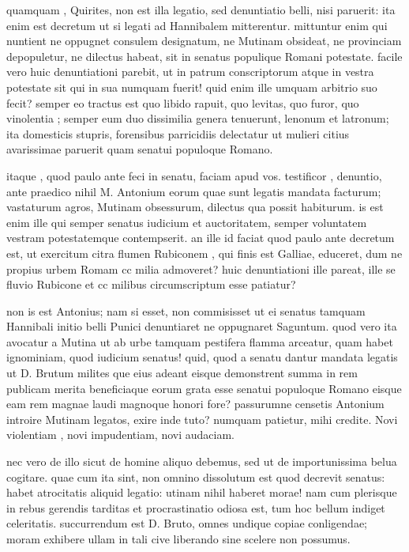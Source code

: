  quamquam , Quirites, non est illa legatio, sed denuntiatio belli, nisi paruerit: ita enim est decretum ut si legati ad Hannibalem mitterentur. mittuntur enim qui nuntient ne oppugnet consulem designatum, ne Mutinam obsideat, ne provinciam depopuletur, ne dilectus habeat, sit in senatus populique Romani potestate. facile vero huic denuntiationi parebit, ut in patrum conscriptorum atque in vestra potestate sit qui in sua numquam fuerit! quid enim ille umquam arbitrio suo fecit? semper eo tractus est quo libido rapuit, quo levitas, quo furor, quo vinolentia ; semper eum duo dissimilia genera tenuerunt, lenonum et latronum; ita domesticis stupris, forensibus parricidiis delectatur ut mulieri citius avarissimae paruerit quam senatui populoque Romano.

 itaque , quod paulo ante feci in senatu, faciam apud vos. testificor , denuntio, ante praedico nihil M. Antonium eorum quae sunt legatis mandata facturum; vastaturum agros, Mutinam obsessurum, dilectus qua possit habiturum. is est enim ille qui semper senatus iudicium et auctoritatem, semper voluntatem vestram potestatemque contempserit. an ille id faciat quod paulo ante decretum est, ut exercitum citra flumen Rubiconem , qui finis est Galliae, educeret, dum ne propius urbem Romam cc milia admoveret? huic denuntiationi ille pareat, ille se fluvio Rubicone et cc milibus circumscriptum esse patiatur?

 non is est Antonius; nam si esset, non commisisset ut ei senatus tamquam Hannibali initio belli Punici denuntiaret ne oppugnaret Saguntum. quod vero ita avocatur a Mutina ut ab urbe tamquam pestifera flamma arceatur, quam habet ignominiam, quod iudicium senatus! quid, quod a senatu dantur mandata legatis ut D. Brutum milites que eius adeant eisque demonstrent summa in rem publicam merita beneficiaque eorum grata esse senatui populoque Romano eisque eam rem magnae laudi magnoque honori fore? passurumne censetis Antonium introire Mutinam legatos, exire inde tuto? numquam patietur, mihi credite. Novi violentiam , novi impudentiam, novi audaciam.

 nec vero de illo sicut de homine aliquo debemus, sed ut de importunissima belua cogitare. quae cum ita sint, non omnino dissolutum est quod decrevit senatus: habet atrocitatis aliquid legatio: utinam nihil haberet morae! nam cum plerisque in rebus gerendis tarditas et procrastinatio odiosa est, tum hoc bellum indiget celeritatis. succurrendum est D. Bruto, omnes undique copiae conligendae; moram exhibere ullam in tali cive liberando sine scelere non possumus.

